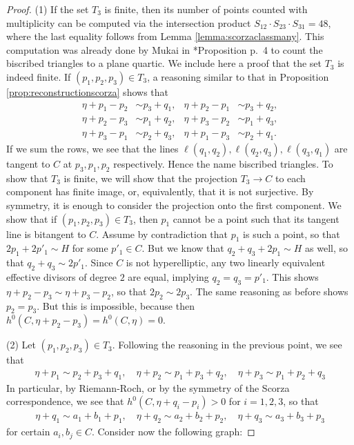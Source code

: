 \documentclass[12pt]{article}
\numberwithin{equation}{section}
\theoremstyle{definition}
\begin{document}
\begin{proof}
		(1) If the set $T_3$ is finite, then its number of points counted with multiplicity can be computed via the intersection product $S_{12}\cdot S_{23}\cdot S_{31} = 48$, where the last equality follows from Lemma \ref{lemma:scorzaclassmany}. This computation was already done by Mukai in \cite{Mukai}*{Proposition p.~4} to count the biscribed triangles to a plane quartic. We include here a proof that the set $T_3$ is indeed finite. If $(p_1,p_2,p_3)\in T_3$, a reasoning similar to that in Proposition \ref{prop:reconstructionscorza} shows that 
		\begin{align*}
		\eta+p_1-p_2 &\sim p_3+q_1, & \eta+p_2-p_1 &\sim p_3+q_2, \\
		\eta+p_2-p_3 &\sim p_1+q_2, & \eta+p_3-p_2 &\sim p_1+q_3, \\
		\eta+p_3-p_1 &\sim p_2+q_3, & \eta+p_1-p_3 &\sim p_2+q_1.
		\end{align*}
		If we sum the rows, we see that the lines $\ell(q_1,q_2),\ell(q_2,q_3),\ell(q_3,q_1)$ are tangent to $C$ at $p_3,p_1,p_2$ respectively. Hence the name biscribed triangles. To show that $T_3$ is finite, we will show that the projection $T_3\to C$ to each component has finite image, or, equivalently, that it is not surjective. By symmetry, it is enough to consider the projection onto the first component. We show that if $(p_1,p_2,p_3)\in T_3$, then $p_1$ cannot be a point such that its tangent line is bitangent to $C$. Assume by contradiction that $p_1$ is such a point, so that $2p_1+2p'_1 \sim H$ for some $p'_1 \in C$. But we know that $q_2+q_3+2p_1 \sim H$ as well, so that $q_2+q_3 \sim 2p'_1$. Since $C$ is not hyperelliptic, any two linearly equivalent effective divisors of degree $2$ are equal, implying $q_2=q_3=p'_1$. This shows $\eta+p_2-p_3 \sim \eta+p_3-p_2$, so that $2p_2\sim 2p_3$. The same reasoning as before shows $p_2=p_3$. But this is impossible, because then $h^0(C,\eta+p_2-p_3) = h^0(C,\eta)=0$.  
		
        (2) Let $(p_1,p_2,p_3)\in T_3$. Following the reasoning in the previous point, we see that
		\begin{align*}
		\eta+p_1 \sim p_2+p_3+q_1, \quad \eta+p_2\sim p_1+p_3+q_2, \quad \eta+p_3\sim p_1+p_2+q_3
		\end{align*}
	    In particular, by Riemann-Roch, or by the symmetry of the Scorza correspondence, we see that $h^0(C,\eta+q_i-p_i)>0$ for $i=1,2,3$, so that
	    \begin{align*}
	    \eta+q_1 \sim a_1+b_1+p_1, \quad \eta+q_2 \sim a_2+b_2+p_2, \quad \eta+q_3 \sim a_3+b_3+p_3 
	    \end{align*}
        for certain $a_i,b_j\in C$. Consider now the following graph:


\end{proof}
\end{document}
